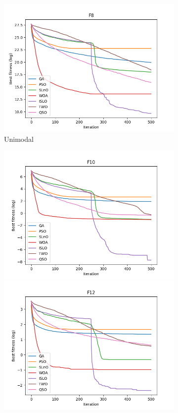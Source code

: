 \documentclass[a4paper,13pt,2p]{report}
\begin{document}
\begin{figure}[!ht]
\begin{subfigure}{0.49\textwidth}
  	 \includegraphics[width=1\linewidth]{png/convergence/islo_uni_F8}
  	\caption{Unimodal}
  	\label{subfig:uni_convergence}
  	\end{subfigure}
   \begin{subfigure}{0.49\textwidth}
   	\includegraphics[width=1\linewidth]{png/convergence/islo_multi_F10}
  	 \includegraphics[width=1\linewidth]{png/convergence/islo_multi_F12}

\end{subfigure}
\end{figure}
\end{document}
